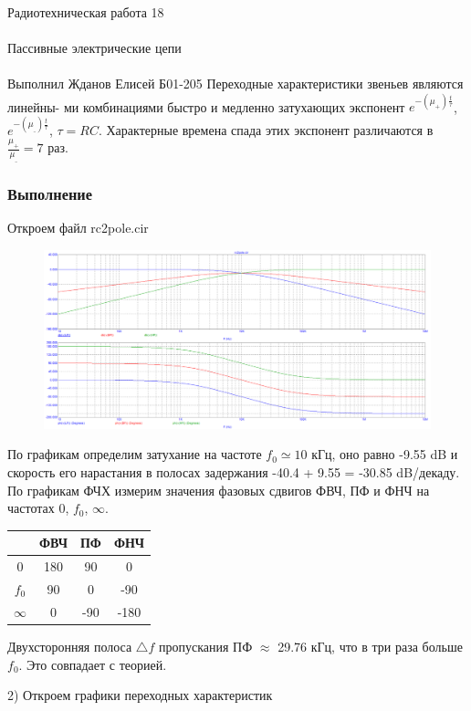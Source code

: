 \documentclass{astroedu-lab}
\begin{document}
\begin{problem}{\huge Радиотехническая работа 18\\\\Пассивные электрические цепи\\\\Выполнил Жданов Елисей Б01-205}
Переходные характеристики звеньев являются линейны-
ми комбинациями быстро и медленно затухающих экспонент $e^{-(\mu_+)\frac{t}{\tau}}$, $e^{-(\mu_{\_})\frac{t}{\tau}}$, $\tau = R C$. Характерные времена спада этих экспонент различаются в $\frac{\mu_{+}}{\mu_{\_}} = 7$ раз.

\subsubsection{Выполнение}

Откроем файл rc2pole.cir

\begin{figure}[!h]
	\centering
	\includegraphics[width=1\textwidth]{2_4.png}
	\label{fig:boiler}
\end{figure}

По графикам определим затухание на частоте $f_0 \simeq 10 $ кГц, оно равно -9.55 dB и скорость его нарастания в полосах задержания -40.4 + 9.55 = -30.85 dB/декаду. По графикам  ФЧХ измерим значения фазовых сдвигов  ФВЧ, ПФ и ФНЧ на частотах 0, $f_0$, $\infty$.

\begin{center}
\begin{tabular}{|c|c|c|c|}
\hline 
 & ФВЧ & ПФ & ФНЧ \\ 
\hline 
0 & 180 & 90 & 0 \\ 
\hline 
$f_0$ & 90 & 0 & -90 \\ 
\hline 
$\infty$ & 0 & -90 & -180 \\ 
\hline 
\end{tabular} 
\end{center}

Двухсторонняя полоса $\triangle f$ пропускания ПФ $\approx$ 29.76 кГц, что в три раза больше $f_0$. Это совпадает с теорией.

2) Откроем графики переходных характеристик


\end{problem}
\end{document}
